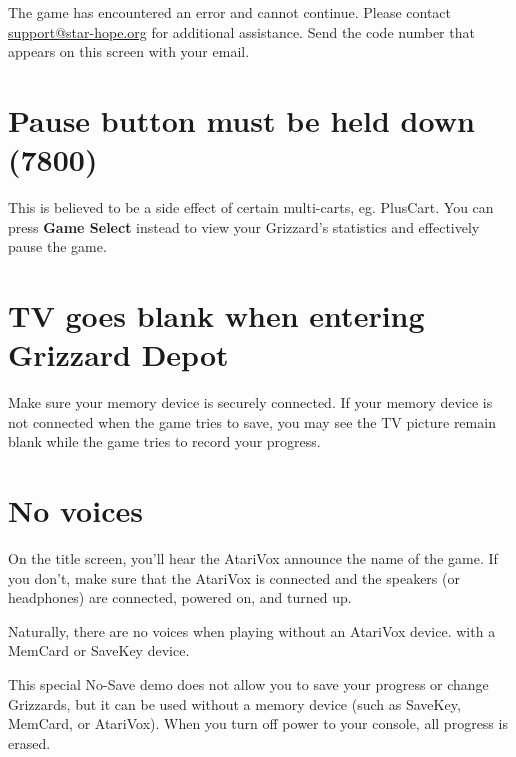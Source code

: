 \documentclass[10pt,twocolumn,openany,article]{memoir}
\begin{document}
The game  has encountered an  error and cannot continue.  Please contact
\href{mailto:support@star-hope.org}{support@star-hope.org}           for
additional assistance. Send the code  number that appears on this screen
with your email.

\ifdefined\ATARIAGESAVE\else

\section*{Pause button must be held down (7800)}

This  is believed  to  be  a side  effect  of  certain multi-carts,  eg.
PlusCart.  You  can press  \textbf{Game  Select}  instead to  view  your
Grizzard's statistics and effectively pause the game.

\fi

\ifdefined\NOSAVE\else\ifdefined\ATARIAGESAVE\else

\section*{TV goes blank when entering Grizzard Depot}

Make  sure your  memory device  is  securely connected.  If your  memory
device is not connected when the game  tries to save, you may see the TV
picture remain blank while the game tries to record your progress.

\fi

\section*{No voices}

On the title  screen, you'll hear the AtariVox announce  the name of the
game. If  you don't, make  sure that the  AtariVox is connected  and the
speakers (or headphones) are connected, powered on, and turned up.

Naturally,  there are  no  voices  when playing  \ifdefined\ATARIAGESAVE
without an AtariVox device. \else with a MemCard or SaveKey device. \fi

\fi

\ifdefined\NOSAVE

\pagebreak
{}

This special  No-Save demo does not  allow you to save  your progress or
change Grizzards,  but it can be  used without a memory  device (such as
SaveKey, MemCard, or AtariVox). When you turn off power to your console,
all progress is erased.
\end{document}
